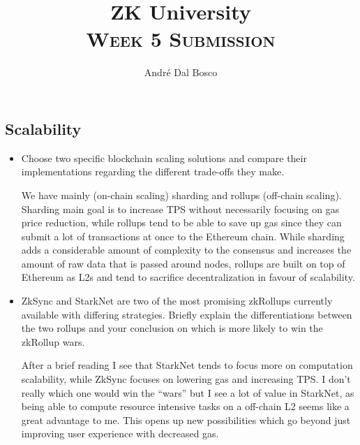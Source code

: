 \documentclass{article}
\title{ZK University \\[4pt] \normalsize\textsc{Week 5 Submission}}
\author{André Dal Bosco \\ \small{\email \quad \discord}}
\begin{document}
\maketitle

\subsection*{Scalability}
\begin{itemize}
    \item Choose two specific blockchain scaling solutions and compare their implementations regarding the different trade-offs they make. \par We have mainly (on-chain scaling) sharding and rollups (off-chain scaling). Sharding main goal is to increase TPS without necessarily focusing on gas price reduction, while rollups tend to be able to save up gas since they can submit a lot of transactions at once to the Ethereum chain. While sharding adds a considerable amount of complexity to the consensus and increases the amount of raw data that is passed around nodes, rollups are built on top of Ethereum as L2s and tend to sacrifice decentralization in favour of scalability.
    \item ZkSync and StarkNet are two of the most promising zkRollups currently available with differing strategies. Briefly explain the differentiations between the two rollups and your conclusion on which is more likely to win the zkRollup wars. \par After a brief reading I see that StarkNet tends to focus more on computation scalability, while ZkSync focuses on lowering gas and increasing TPS. I don't really which one would win the ``wars'' but I see a lot of value in StarkNet, as being able to compute resource intensive tasks on a off-chain L2 seems like a great advantage to me. This opens up new possibilities which go beyond just improving user experience with decreased gas.
\end{itemize}
\end{document}

